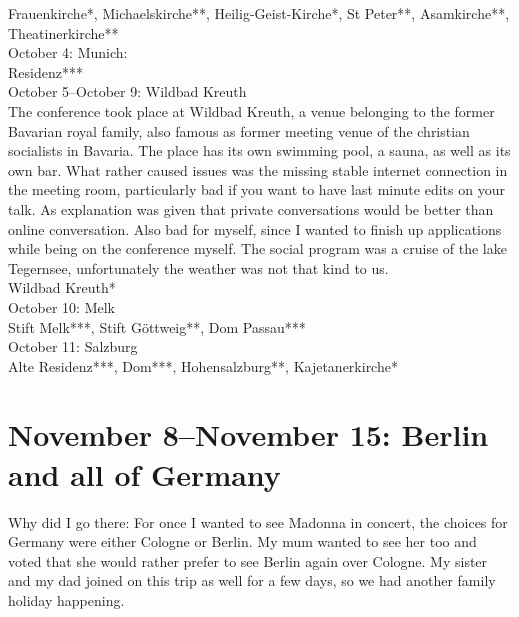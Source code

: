 Frauenkirche*, Michaelskirche**, Heilig-Geist-Kirche*, St Peter**, Asamkirche**, Theatinerkirche**\\

October 4: Munich:\\
Residenz***\\

October 5--October 9: Wildbad Kreuth\\
The conference took place at Wildbad Kreuth, a venue belonging to the former Bavarian royal family, also famous as former meeting venue of the christian socialists in Bavaria. The place has its own swimming pool, a sauna, as well as its own bar. What rather caused issues was the missing stable internet connection in the meeting room, particularly bad if you want to have last minute edits on your talk. As explanation was given that private conversations would be better than online conversation. Also bad for myself, since I wanted to finish up applications while being on the conference myself. The social program was a cruise of the lake Tegernsee, unfortunately the weather was not that kind to us.\\

Wildbad Kreuth*\\

October 10: Melk\\
Stift Melk***, Stift G\"ottweig**, Dom Passau***\\

October 11: Salzburg\\
Alte Residenz***, Dom***, Hohensalzburg**, Kajetanerkirche*

\section{November 8--November 15: Berlin and all of Germany}
\label{2015:Berlin}

Why did I go there: For once I wanted to see Madonna in concert, the choices for Germany were either Cologne or Berlin. My mum wanted to see her too and voted that she would rather prefer to see Berlin again over Cologne. My sister and my dad joined on this trip as well for a few days, so we had another family holiday happening.\\

